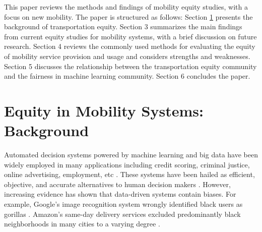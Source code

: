 \documentclass[11pt]{article}
\begin{document}
This paper reviews the methods and findings of mobility equity studies, with a focus on new mobility. The paper is structured as follows: Section \ref{sec:headings} presents the background of transportation equity. Section 3 summarizes the main findings from current equity studies for mobility systems, with a brief discussion on future research. Section 4 reviews the commonly used methods for evaluating the equity of mobility service provision and usage and considers strengths and weaknesses.  Section 5 discusses the relationship between the transportation equity community and the fairness in machine learning community. Section 6 concludes the paper. 







\section{Equity in Mobility Systems: Background}
\label{sec:headings}

Automated decision systems powered by machine learning and big data have been widely employed in many applications including credit scoring, criminal justice, online advertising, employment, etc \cite{zliobaite2015survey,petrasic2017algorithms, miller2015algorithms, rudin2013predictive}. These systems have been hailed as efficient, objective, and accurate alternatives to human decision makers \cite{barocas2017fairness}. However, increasing evidence has shown that data-driven systems contain biases. For example, Google’s image recognition system wrongly identified black users as gorillas \cite{guynn2015google}. Amazon’s same-day delivery services excluded predominantly black neighborhoods in many cities to a varying degree \cite{ingold2016amazon}. 
\end{document}
